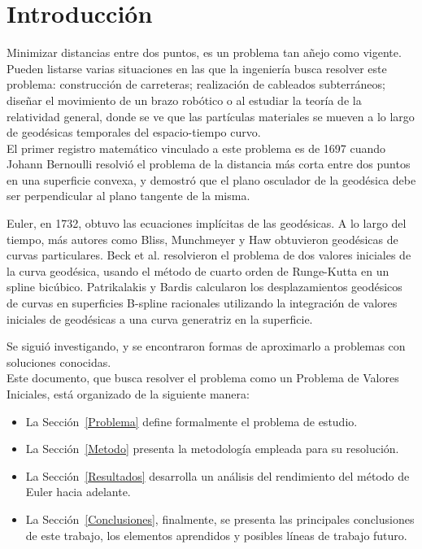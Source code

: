 \documentclass{endm}
\begin{document}
\tableofcontents
\clearpage
%
\section{Introducci\'on}\label{intro}
\tab Minimizar distancias entre dos puntos, es un problema tan añejo como vigente. Pueden listarse varias situaciones en las que la ingenier\'ia busca resolver este problema: construcci\'on de carreteras; realizaci\'on de cableados subterr\'aneos; diseñar el movimiento de un brazo rob\'otico o al estudiar la teor\'ia de la relatividad general, donde se ve que las part\'iculas materiales se mueven a lo largo de geod\'esicas temporales del espacio-tiempo curvo. \\

El primer registro matem\'atico vinculado a este problema es de 1697 cuando Johann Bernoulli resolvi\'o  el problema de la distancia m\'as corta entre dos puntos en una superficie convexa, y demostr\'o que el plano osculador de la geod\'esica debe ser perpendicular al plano tangente de la misma.

Euler, en 1732, obtuvo las ecuaciones impl\'icitas de las geod\'esicas. 
A lo largo del tiempo, m\'as autores como Bliss, Munchmeyer y Haw obtuvieron geod\'esicas de curvas particulares. Beck et al. resolvieron el problema de dos valores iniciales de la curva geod\'esica, usando el m\'etodo de cuarto orden de Runge-Kutta en un spline bic\'ubico. Patrikalakis y Bardis calcularon los desplazamientos geod\'esicos de curvas en superficies B-spline racionales utilizando la integraci\'on de valores iniciales de geod\'esicas a una curva generatriz  en la superficie.

Se sigui\'o investigando, y se encontraron formas de aproximarlo a problemas con soluciones conocidas.\\ 

Este documento, que busca resolver el problema como un Problema de Valores Iniciales,  est\'a organizado de la siguiente manera:
\begin{itemize}
\item La Secci\'on~\ref{Problema} define formalmente el problema de estudio.
\item La Secci\'on~\ref{Metodo} presenta la metodolog\'ia empleada para su resoluci\'on.
\item La Secci\'on~\ref{Resultados} desarrolla un an\'alisis del rendimiento del m\'etodo de Euler hacia adelante.
\item La Secci\'on~\ref{Conclusiones}, finalmente, se presenta las principales conclusiones de este trabajo, los elementos aprendidos y posibles l\'ineas de trabajo futuro.
\end{itemize}
\end{document}
